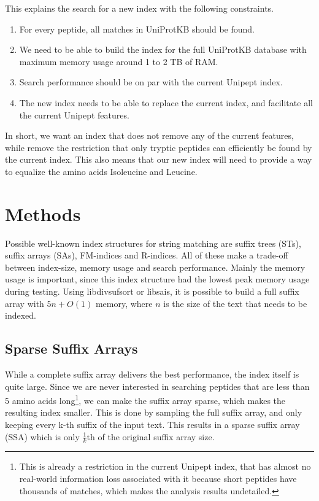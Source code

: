 \documentclass[11pt]{article}
\begin{document}
\begin{multicols}{2}
        This explains the search for a new index with the following constraints.
        \begin{enumerate}
            \item For every peptide, all matches in UniProtKB should be found.
            \item We need to be able to build the index for the full UniProtKB database with maximum memory usage around 1 to 2 TB of RAM\@.
            \item Search performance should be on par with the current Unipept index.
            \item The new index needs to be able to replace the current index, and facilitate all the current Unipept features.
        \end{enumerate}

        In short, we want an index that does not remove any of the current features, while remove the restriction that only tryptic peptides can efficiently be found by the current index.
        This also means that our new index will need to provide a way to equalize the amino acids Isoleucine and Leucine.


        \section{Methods}\label{sec:methods}
        Possible well-known index structures for string matching are suffix trees (STs), suffix arrays (SAs), FM-indices and R-indices.
        All of these make a trade-off between index-size, memory usage and search performance.
        Mainly the memory usage is important, since this index structure had the lowest peak memory usage during testing.
        Using libdivsufsort or libsais, it is possible to build a full suffix array with $5n + O(1)$ memory, where $n$ is the size of the text that needs to be indexed.

        \subsection{Sparse Suffix Arrays}
        While a complete suffix array delivers the best performance, the index itself is quite large.
        Since we are never interested in searching peptides that are less than 5 amino acids long\footnote{This is already a restriction in the current Unipept index, that has almost no real-world information loss associated with it because short peptides have thousands of matches, which makes the analysis results undetailed.}, we can make the suffix array sparse, which makes the resulting index smaller.
        This is done by sampling the full suffix array, and only keeping every k-th suffix of the input text.
        This results in a sparse suffix array (SSA) which is only $\frac{1}{k}$th of the original suffix array size.


\end{multicols}
\end{document}
